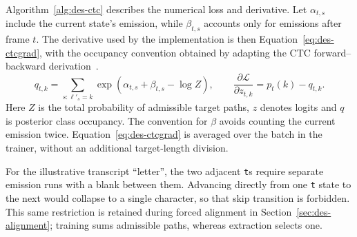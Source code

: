 Algorithm~\ref{alg:des-ctc} describes the numerical loss and derivative. Let $\alpha_{t,s}$ include the current state's emission, while $\beta_{t,s}$ accounts only for emissions after frame $t$. The derivative used by the implementation is then Equation~\ref{eq:des-ctcgrad}, with the occupancy convention obtained by adapting the CTC forward--backward derivation~\cite[PDF pp.~5--6]{graves2006}.
\begin{equation}
q_{t,k}=\sum_{s:\ell'_s=k}\exp(\alpha_{t,s}+\beta_{t,s}-\log Z),
\qquad \frac{\partial\mathcal L}{\partial z_{t,k}}=p_t(k)-q_{t,k}.
\label{eq:des-ctcgrad}
\end{equation}
Here $Z$ is the total probability of admissible target paths, $z$ denotes logits and $q$ is posterior class occupancy. The convention for $\beta$ avoids counting the current emission twice. Equation~\ref{eq:des-ctcgrad} is averaged over the batch in the trainer, without an additional target-length division.
\begin{designalgorithm}
\caption{Numerical CTC loss and logit gradient}
\label{alg:des-ctc}
\begin{designpseudo}
\end{designpseudo}
\end{designalgorithm}

For the illustrative transcript ``letter'', the two adjacent \texttt{t}s require separate emission runs with a blank between them. Advancing directly from one \texttt{t} state to the next would collapse to a single character, so that skip transition is forbidden. This same restriction is retained during forced alignment in Section~\ref{sec:des-alignment}; training sums admissible paths, whereas extraction selects one.

